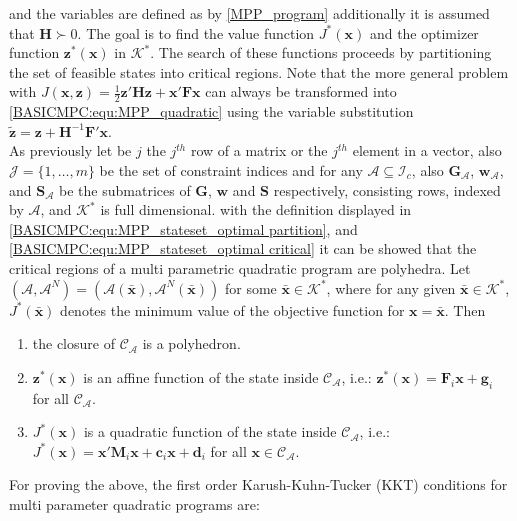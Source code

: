     and the variables are defined as by \ref{MPP_program} additionally it is assumed that $\textbf{H}\succ 0$. The goal is to find the value function $J^*(\textbf{x})$ and the optimizer function $\textbf{z}^*(\textbf{x})$ in $\mathcal{K}^*$. The search of these functions proceeds by partitioning the set of feasible states into critical regions. Note that the more general problem with $J(\textbf{x},\textbf{z})=\frac{1}{2}\textbf{z}'\textbf{H}\textbf{z}+\textbf{x}'\textbf{F}\textbf{x}$ can always be transformed into \ref{BASICMPC:equ:MPP_quadratic} using the variable substitution $\tilde{\textbf{z}}=\textbf{z}+\textbf{H}^{-1}\textbf{F}'\textbf{x}$.\\
    As previously let be $j$ the $j^{th}$ row of a matrix or the $j^{th}$ element in a vector, also $\mathcal{J}=\{1,\dots,m\}$ be the set of constraint indices and for any $\mathcal{A}\subseteq\mathcal{I}_c$, also $\textbf{G}_{\mathcal{A}}$, $\textbf{w}_{\mathcal{A}}$, and $\textbf{S}_{\mathcal{A}}$ be the submatrices of $\textbf{G}$, $\textbf{w}$ and $\textbf{S}$ respectively, consisting rows, indexed by $\mathcal{A}$, and $\mathcal{K}^*$ is full dimensional.
    with the definition displayed in \ref{BASICMPC:equ:MPP_stateset_optimal partition}, and \ref{BASICMPC:equ:MPP_stateset_optimal critical} it can be showed that the critical regions of a multi parametric quadratic program are polyhedra. Let $(\mathcal{A},\mathcal{A}^N)=(\mathcal{A}(\bar{\textbf{x}}),\mathcal{A}^N(\bar{\textbf{x}}))$ for some $\bar{\textbf{x}}\in\mathcal{K}^*$, where for any given $\bar{\textbf{x}}\in\mathcal{K}^*$, $J^*(\bar{\textbf{x}})$ denotes the minimum value of the objective function for $\textbf{x}=\bar{\textbf{x}}$. Then
    \begin{enumerate}
    \item the closure of $\mathcal{C}_{\mathcal{A}}$ is a polyhedron.
    \item $\textbf{z}^*(\textbf{x})$ is an affine function of the state inside $\mathcal{C}_{\mathcal{A}}$, i.e.: $\textbf{z}^*(\textbf{x})=\textbf{F}_i\textbf{x}+\textbf{g}_i$ for all $\mathcal{C}_{\mathcal{A}}$.
    \item $J^*(\textbf{x})$ is a quadratic function of the state inside $\mathcal{C}_{\mathcal{A}}$, i.e.: $J^*(\textbf{x})=\textbf{x}'\textbf{M}_i\textbf{x}+\textbf{c}_i\textbf{x}+\textbf{d}_i$ for all $\textbf{x}\in\mathcal{C}_{\mathcal{A}}$.
    \end{enumerate}

    For proving the above, the first order Karush-Kuhn-Tucker (KKT) conditions for multi parameter quadratic programs are:

